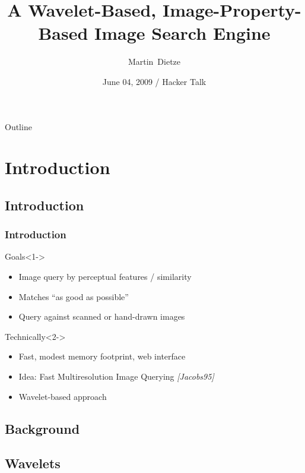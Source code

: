 \documentclass{beamer}
\title[Wavelet-Based Image Search] %
{A Wavelet-Based, Image-Property-Based Image Search Engine}
\author{Martin~Dietze}
\institute{Freiheit.com Technologies}
\date[Short Occasion] %
{June 04, 2009 / Hacker Talk}
\begin{document}
\begin{frame}
  \titlepage
\end{frame}

\begin{frame}{Outline}
  \tableofcontents
\end{frame}


\section{Introduction}
\subsection{Introduction}

\begin{frame}
  \frametitle{Introduction}

  \begin{block}{Goals}<1->
    \begin{itemize}
    \item Image query by perceptual features / similarity
    \item Matches ``as good as possible''
    \item Query against scanned or hand-drawn images
    \end{itemize}
  \end{block}

  \begin{block}{Technically}<2->
    \begin{itemize}
    \item Fast, modest memory footprint, web interface
    \item Idea: Fast Multiresolution Image Querying \emph{[Jacobs95]}
    \item Wavelet-based approach
    \end{itemize}
  \end{block}
\end{frame}

\subsection{Background}

\subsection{Wavelets}
\end{document}
